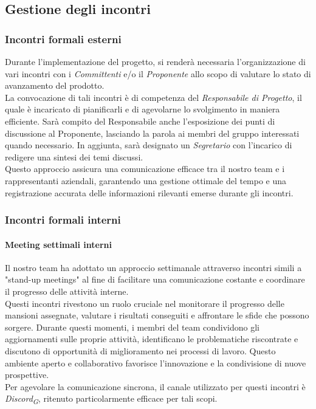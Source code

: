 \documentclass{article}
\begin{document}
\subsection{Gestione degli incontri}
\subsubsection{Incontri formali esterni}
Durante l'implementazione del progetto, si renderà necessaria l'organizzazione di vari incontri con i \textit{Committenti} e/o il \textit{Proponente} allo scopo di valutare lo stato di avanzamento del prodotto.\\
La convocazione di tali incontri è di competenza del \textit{Responsabile di Progetto}, il quale è incaricato di pianificarli e di agevolarne lo svolgimento in maniera efficiente. Sarà compito del Responsabile anche l'esposizione dei punti di discussione al Proponente, lasciando la parola ai membri del gruppo interessati quando necessario.
In aggiunta, sarà designato un \textit{Segretario} con l'incarico di redigere una sintesi dei temi discussi. \\
Questo approccio assicura una comunicazione efficace tra il nostro team e i rappresentanti aziendali, garantendo una gestione ottimale del tempo e una registrazione accurata delle informazioni rilevanti emerse durante gli incontri.

\subsubsection{Incontri formali interni}
\paragraph{Meeting settimali interni}
Il nostro team ha adottato un approccio settimanale attraverso incontri simili a "stand-up meetings" al fine di facilitare una comunicazione costante e coordinare il progresso delle attività interne.\\
Questi incontri rivestono un ruolo cruciale nel monitorare il progresso delle mansioni assegnate, valutare i risultati conseguiti e affrontare le sfide che possono sorgere. Durante questi momenti, i membri del team condividono gli aggiornamenti sulle proprie attività, identificano le problematiche riscontrate e discutono di opportunità di miglioramento nei processi di lavoro. Questo ambiente aperto e collaborativo favorisce l'innovazione e la condivisione di nuove prospettive.\\
Per agevolare la comunicazione sincrona, il canale utilizzato per questi incontri è \textit{Discord}\textsubscript{\textit{G}}, ritenuto particolarmente efficace per tali scopi.
\end{document}
